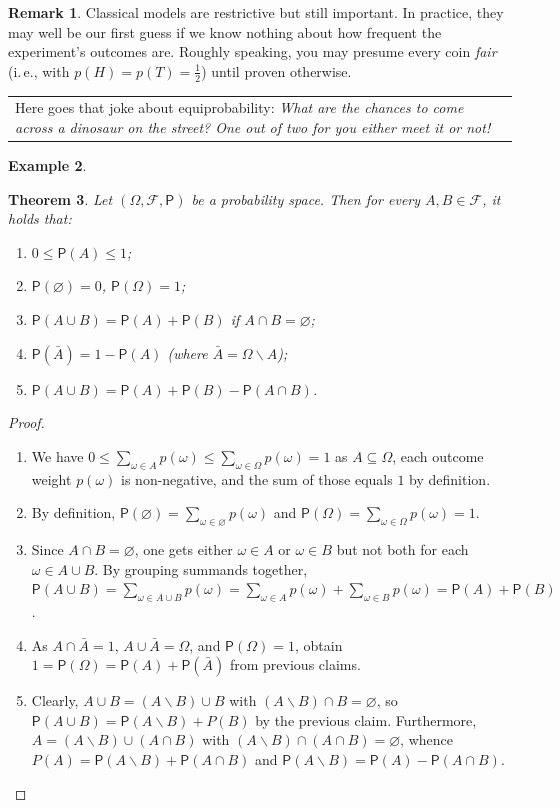 \documentclass[12pt,notitlepage]{article}
\theoremstyle{plain}
\newtheorem{thm}{Theorem}[section]
\theoremstyle{definition}
\newtheorem{exm}[thm]{Example}
\newtheorem{rem}[thm]{Remark}
\theoremstyle{plain}
\newcommand{\sbs}{\subseteq}
\renewcommand{\setminus}{\smallsetminus}
\newcommand{\void}{\varnothing}
\newcommand{\1}{\mathbf{1}}
\newcommand{\0}{\mathbf{0}}
\newcommand{\mF}{\mathcal{F}}
\renewcommand{\P}{\mathsf{P}}
\newcommand{\mcomm}[1]{
\medskip\noindent\begin{tabular}{| l}
\parbox{0.99\textwidth}{{\small
#1 }}\end{tabular}
\smallskip}
\begin{document}
\begin{rem}
Classical models are restrictive but still important. In practice, they may well be our first guess if we know nothing about how frequent the experiment's outcomes are. Roughly speaking, you may presume every coin \emph{fair} (i.\,e., with $p(H) = p(T) = \frac{1}{2}$) until proven otherwise.
\end{rem}
\mcomm{Here goes that joke about equiprobability: \emph{What are the chances to come across a dinosaur on the street? One out of two for you either meet it or not!}}

\begin{exm}

\end{exm}


\begin{thm}\label{prob:prob_prop}
Let $(\Omega, \mF, \P)$ be a probability space. Then for every $A, B \in \mF$, it holds that:
\begin{enumerate}
\item $0 \leq \P(A) \leq 1$;
\item $\P(\void) = 0$, $\P(\Omega) = 1$;
\item $\P(A \cup B) = \P(A) + \P(B)$ if $A \cap B = \void$;
\item $\P(\bar A) = 1 - \P(A)$ (where $\bar A = \Omega \setminus A$);
\item $\P(A \cup B) = \P(A) + \P(B) - \P(A \cap B)$.
\end{enumerate}
\end{thm}
\begin{proof}\phantom{x}
\begin{enumerate}
\item We have $0 \leq \sum_{\omega \in A} p(\omega) \leq \sum_{\omega \in \Omega} p(\omega) = 1$ as $A \sbs \Omega$, each outcome weight $p(\omega)$ is non-negative, and the sum of those equals $1$ by definition.
\item By definition, $\P(\void) = \sum_{\omega \in \void} p(\omega)$ and $\P(\Omega) = \sum_{\omega \in \Omega} p(\omega) = 1$.
\item Since $A \cap B = \void$, one gets either $\omega \in A$ or $\omega \in B$ but not both for each $\omega \in A \cup B$. By grouping summands together, $\P(A \cup B) = \sum_{\omega \in A \cup B} p(\omega) = \sum_{\omega \in A} p(\omega) + \sum_{\omega \in B} p(\omega) = \P(A) + \P(B)$.
\item As $A \cap \bar A = 1$, $A \cup \bar A = \Omega$, and $\P(\Omega) = 1$, obtain $1 = \P(\Omega) = \P(A) + \P(\bar A)$ from previous claims.
\item Clearly, $A \cup B = (A \setminus B) \cup B$ with $(A \setminus B) \cap B = \void$, so $\P(A \cup B) = \P(A \setminus B) + P(B)$ by the previous claim. Furthermore, $A = (A \setminus B) \cup (A \cap B)$ with $(A \setminus B) \cap (A \cap B) = \void$, whence $P(A) = \P(A \setminus B) + \P(A \cap B)$ and $\P(A \setminus B) = \P(A) - \P(A \cap B)$.
\end{enumerate}
\end{proof}
\end{document}
